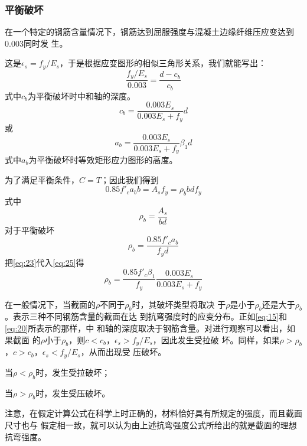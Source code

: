 \documentclass[12pt,a4paper]{book}
\begin{document}
\subsubsection{平衡破坏}

在一个特定的钢筋含量情况下，钢筋达到屈服强度与混凝土边缘纤维压应变达到0.003同时发
生。

这是$\epsilon_s=f_y/E_s$，于是根据应变图形的相似三角形关系，我们就能写出：
\begin{equation*}
  \frac{f_y/E_s}{0.003}=\frac{d-c_b}{c_b}
\end{equation*}
式中$c_b$为平衡破坏时中和轴的深度。
\begin{equation}
  \label{eq:22}
  c_b=\frac{0.003E_s}{0.003E_s+f_y}d
\end{equation}
或
\begin{equation}
  \label{eq:23}
  a_b=\frac{0.003E_s}{0.003E_s+f_y}\beta_1 d
\end{equation}
式中$a_b$为平衡破坏时等效矩形应力图形的高度。

为了满足平衡条件，$C=T$；因此我们得到
\begin{equation*}
  0.85f'_ca_bb=A_sf_y=\rho_bbdf_y
\end{equation*}
式中
\begin{equation*}
  \rho_b=\frac{A_s}{bd}
\end{equation*}
对于平衡破坏
\begin{equation}
  \label{eq:25}
  \rho_b=\frac{0.85f'_ca_b}{f_yd}
\end{equation}
把\cref{eq:23}代入\cref{eq:25}得
\begin{equation}
  \label{eq:26}
  \rho_b=\frac{0.85f'_c\beta_1}{f_y}\frac{0.003E_s}{0.003E_s+f_y}
\end{equation}

在一般情况下，当截面的$\rho$不同于$\rho_b$时，其破坏类型将取决
于$\rho$是小于$\rho_b$还是大于$\rho_b$。表示三种不同钢筋含量的截面在达
到抗弯强度时的应变分布。正如\cref{eq:15}和\cref{eq:20}所表示的那样，中
和轴的深度取决于钢筋含量。对进行观察可以看出，如果截面
的$\rho$小于$\rho_b$，则$c<c_b$，$\epsilon_s>f_y/E_s$，因此发生受拉破
坏。同样，如果$\rho>\rho_b$，$c>c_b$，$\epsilon_s<f_y/E_s$，从而出现受
压破坏。

当$\rho<\rho_b$时，发生受拉破坏；

当$\rho>\rho_b$时，发生受压破坏。

注意，在假定计算公式在科学上时正确的，材料恰好具有所规定的强度，而且截面尺寸也与
假定相一致，就可以认为由上述抗弯强度公式所给出的就是截面的理想抗弯强度。
\end{document}
